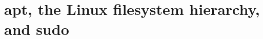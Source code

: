 \chapter{apt, the Linux filesystem hierarchy, and sudo}
\label{ch:apt-the-linux-filesystem-hierarchy-and}

